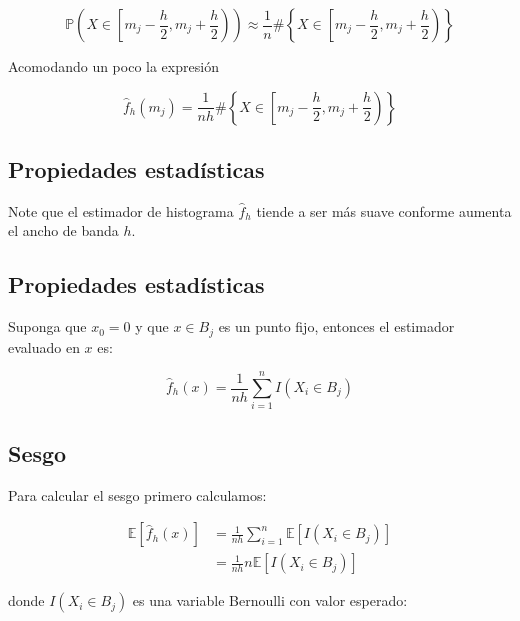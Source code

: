 \documentclass[
  12pt,
]{book}
\theoremstyle{definition}
\theoremstyle{definition}
\theoremstyle{definition}
\theoremstyle{definition}
\theoremstyle{remark}
\begin{document}
\begin{equation*}
    \mathbb{P} \left(X\in \left[m_j - \frac{h}{2},m_j + \frac{h}{2}\right) \right)  \approx   \frac{1}{n} \#
    \left\{X\in \left[m_j - \frac{h}{2},m_j + \frac{h}{2}\right) \right\}
\end{equation*}

Acomodando un poco la expresión

\begin{equation*}
\hat{f}_h(m_j) =  \frac{1}{nh} \#
\left\{X\in \left[m_j - \frac{h}{2},m_j + \frac{h}{2}\right) \right\}
\end{equation*}

\hypertarget{propiedades-estaduxedsticas}{%
\subsection{Propiedades estadísticas}\label{propiedades-estaduxedsticas}}

Note que el estimador de histograma \(\hat f_h\) tiende a ser más suave conforme aumenta el ancho de banda \(h\).

\hypertarget{propiedades-estaduxedsticas-1}{%
\subsection{Propiedades estadísticas}\label{propiedades-estaduxedsticas-1}}

Suponga que \(x_0 = 0\) y que \(x \in B_j\) es un punto fijo, entonces el estimador evaluado en \(x\) es:

\begin{equation*}
\hat{f}_h(x) =  \frac{1}{nh} \sum_{i = 1}^{n} I(X_i \in B_j)
\end{equation*}

\hypertarget{sesgo}{%
\subsection{Sesgo}\label{sesgo}}

Para calcular el sesgo primero calculamos:

\begin{align*}
\mathbb{E}\left[ \hat{f}_h(x)\right]
& =  \frac{1}{nh} \sum_{i = 1}^{n} \mathbb{E}\left[ I(X_i \in B_j)\right] \\
& = \frac{1}{nh} n \mathbb{E}\left[ I(X_i \in B_j)\right]
\end{align*}

donde \(I(X_i \in B_j)\) es una variable Bernoulli con valor esperado:
\end{document}
